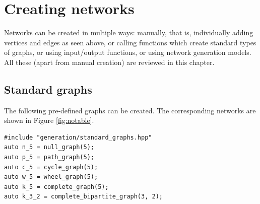 \chapter{Creating networks} \label{ch:creation}

Networks can be created in multiple ways: manually, that is, individually adding vertices and edges as seen above, or calling functions which create standard types of graphs, or using input/output functions, or using network generation models. All these (apart from manual creation) are reviewed in this chapter.

\section{Standard graphs}

The following pre-defined graphs can be created. The corresponding networks are shown in Figure \ref{fig:notable}.
\begin{lstlisting}[style=c++] 
#include "generation/standard_graphs.hpp"
auto n_5 = null_graph(5);
auto p_5 = path_graph(5);
auto c_5 = cycle_graph(5);
auto w_5 = wheel_graph(5);
auto k_5 = complete_graph(5);
auto k_3_2 = complete_bipartite_graph(3, 2);
\end{lstlisting}

